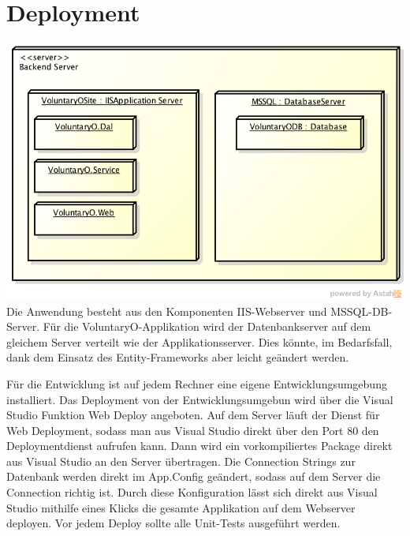 \chapter{Deployment}
	\includegraphics[width=\textwidth]{content/architekturdokumentation/images/DeploymentDiagram.png}
	Die Anwendung besteht aus den Komponenten IIS-Webserver und MSSQL-DB-Server. Für die VoluntaryO-Applikation wird der Datenbankserver auf dem gleichem Server verteilt wie der Applikationsserver. Dies könnte, im Bedarfsfall, dank dem Einsatz des Entity-Frameworks aber leicht geändert werden.

	Für die Entwicklung ist auf jedem Rechner eine eigene Entwicklungsumgebung installiert. Das Deployment von der Entwicklungsumgebun wird über die Visual Studio Funktion Web Deploy angeboten. Auf dem Server läuft der Dienst für Web Deployment, sodass man aus Visual Studio direkt über den Port 80 den Deploymentdienst aufrufen kann.
	Dann wird ein vorkompiliertes Package direkt aus Visual Studio an den Server übertragen. Die Connection Strings zur Datenbank werden direkt im App.Config geändert, sodass auf dem Server die Connection richtig ist.
	Durch diese Konfiguration lässt sich direkt aus Visual Studio mithilfe eines Klicks die gesamte Applikation auf dem Webserver deployen.
	Vor jedem Deploy sollte alle Unit-Tests ausgeführt werden.